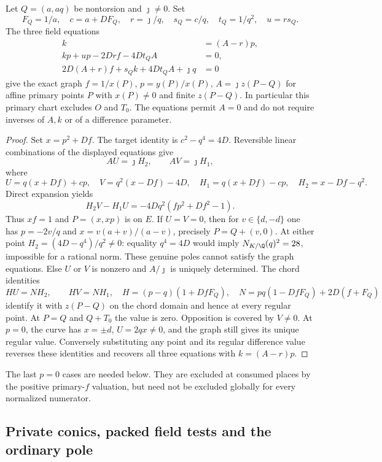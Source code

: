 \begin{lemma}
\label{lem:quartic-joint-chart}
Let $Q=(a,aq)$ be nontorsion and $\jmath\ne0$. Set
\[
 F_Q=1/a,\quad c=a+DF_Q,\quad
 r=\jmath/q,\quad s_Q=c/q,\quad t_Q=1/q^2,\quad u=rs_Q.
\]
The three field equations
\begin{align}
 k&=(A-r)p,\\
 kp+up-2Drf-4Dt_QA&=0,\\
 2D(A+r)f+s_Qk+4Dt_QA+\jmath q&=0
\end{align}
give the exact graph $f=1/x(P)$, $p=y(P)/x(P)$,
$A=\jmath z(P-Q)$ for affine primary points $P$ with $x(P)\ne0$
and finite $z(P-Q)$. In particular this primary chart excludes $O$ and
$T_0$. The equations permit $A=0$ and do not
require inverses of $A,k$ or of a difference parameter.
\end{lemma}
\begin{proof}
Set $x=p^2+Df$. The target identity is $c^2-q^4=4D$.
Reversible linear combinations of the displayed equations give
\[
 A U=\jmath H_2,\qquad A V=\jmath H_1,
\]
where
\[
 U=q(x+Df)+cp,\quad V=q^2(x-Df)-4D,\quad
 H_1=q(x+Df)-cp,\quad H_2=x-Df-q^2.
\]
Direct expansion yields
\[
 H_2V-H_1U=-4Dq^2(fp^2+Df^2-1).
\]
Thus $xf=1$ and $P=(x,xp)$ is on $E$. If $U=V=0$, then for
$v\in\{d,-d\}$ one has
$p=-2v/q$ and $x=v(a+v)/(a-v)$, precisely $P=Q+(v,0)$.
At either point $H_2=(4D-q^4)/q^2\ne0$: equality $q^4=4D$ would imply
$N_{K/\Q}(q)^2=28$, impossible for a rational norm. These genuine poles
cannot satisfy the graph equations. Else $U$ or $V$ is nonzero and
$A/\jmath$ is uniquely determined. The chord identities
\[
 H U=N H_2,\qquad H V=N H_1,
\quad H=(p-q)(1+DfF_Q),\quad
 N=pq(1-DfF_Q)+2D(f+F_Q)
\]
identify it with $z(P-Q)$ on the chord domain and hence at every regular
point. At $P=Q$ and $Q+T_0$ the value is zero. Opposition is covered by
$V\ne0$. At $p=0$, the curve has $x=\pm d$, $U=2qx\ne0$, and the graph
still gives its unique regular value. Conversely substituting any point
and its regular difference value reverses these identities and recovers
all three equations with $k=(A-r)p$.
\end{proof}

The last $p=0$ cases are needed below. They are excluded at consumed places
by the positive primary-$f$ valuation, but need not be excluded globally
for every normalized numerator.

\subsection{Private conics, packed field tests and the ordinary pole}

